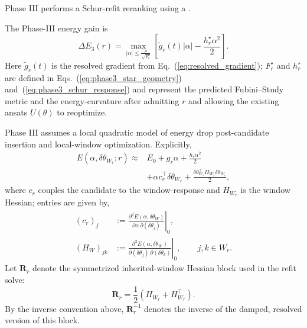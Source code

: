 \documentclass[
  reprint,
  amsmath,
  amssymb,
  aps,
  pra,
  nofootinbib,
  superscriptaddress,
  floatfix
]{revtex4-2}
\begin{document}
Phase III performs a Schur-refit reranking using a . 

The Phase-III energy gain is
\begin{equation}
\Delta E_{3}(r)=
\max_{|\alpha|\le \frac{\rho}{\sqrt{F_r^\star}}}
\left[\widetilde g_r(t)|\alpha|-\frac{h_r^\star \alpha^2}{2}\right].
\label{eq:phase3_gain}
\end{equation}
Here $\widetilde g_r(t)$ is the resolved gradient from Eq.~(\ref{eq:resolved_gradient}); $F_r^\star$ and $h_r^\star$ are defined in Eqs.~(\ref{eq:phase3_star_geometry}) and~(\ref{eq:phase3_schur_response}) and represent the predicted Fubini--Study metric and the energy-curvature after admitting $r$ and allowing the existing ansats $U(\theta)$ to reoptimize.

Phase III assumes a local quadratic model of energy drop post-candidate insertion and local-window optimization. Explicitly, 
\begin{equation}
\begin{split}
E(\alpha,\delta\theta_{W_r};r)\approx{}&E_0+g_r\alpha+\frac{h_r\alpha^2}{2} \\
&+\alpha c_r^{\top}\delta\theta_{W_r}
+\frac{\delta\theta_{W_r}^{\top}H_{W_r}\delta\theta_{W_r}}{2},
\end{split}
\label{eq:local_quadratic}
\end{equation}
where $c_r$ couples the candidate to the window-response and $H_{W_r}$ is the window Hessian; entries are given by,
\begin{equation}
\begin{aligned}
(c_r)_j&:=
\left.
\frac{\partial^2E(\alpha,\delta\theta_W)}
{\partial\alpha\,\partial(\delta\theta_j)}
\right|_0,\\
(H_W)_{jk}&:=
\left.
\frac{\partial^2E(\alpha,\delta\theta_W)}
{\partial(\delta\theta_j)\,\partial(\delta\theta_k)}
\right|_0,
\qquad j,k\in W_r .
\end{aligned}
\label{eq:phase3_window_derivatives}
\end{equation}
Let \(\mathbf R_r\) denote the symmetrized inherited-window Hessian block used in the refit solve:
\begin{equation}
\mathbf R_r=\frac12(H_{W_r}+H_{W_r}^{\top}).
\label{eq:phase3_regularized_hessian}
\end{equation}
By the inverse convention above, \(\mathbf R_r^{-1}\) denotes the inverse of the damped, resolved version of this block.
\end{document}
